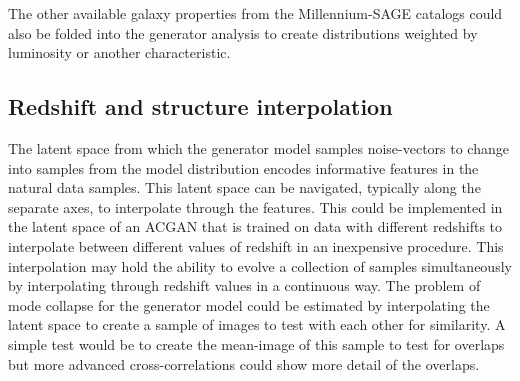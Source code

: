 \documentclass[twocolumn]{article}
\numberwithin{equation}{section}
\begin{document}
The other available galaxy properties from the Millennium-SAGE catalogs could also be folded into the generator analysis to create distributions weighted by luminosity or another characteristic. 



\subsection{Redshift and structure interpolation} The latent space from which the generator model samples noise-vectors to change into samples from the model distribution encodes informative features in the natural data samples. This latent space can be navigated, typically along the separate axes, to interpolate through the features. This could be implemented in the latent space of an ACGAN that is trained on data with different redshifts to interpolate between different values of redshift in an inexpensive procedure. This interpolation may hold the ability to evolve a collection of samples simultaneously by interpolating through redshift values in a continuous way. The problem of mode collapse for the generator model could be estimated by interpolating the latent space to create a sample of images to test with each other for similarity. A simple test would be to create the mean-image of this sample to test for overlaps but more advanced cross-correlations could show more detail of the overlaps.  
\end{document}
